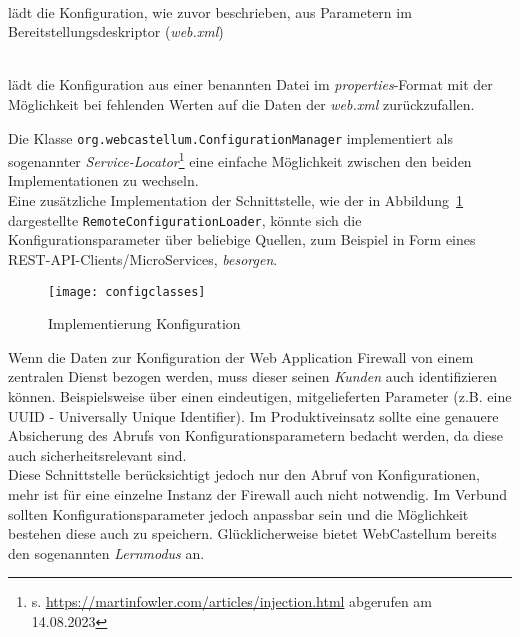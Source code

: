 \begin{description}
  \small
\item[DefaultConfigurationLoader] \hfill \\
  lädt die Konfiguration, wie zuvor beschrieben, aus Parametern im Bereitstellungsdeskriptor (\emph{web.xml})
\item[PropertiesFileConfigurationLoader] \hfill \\
  lädt die Konfiguration aus einer benannten Datei im \emph{properties}-Format mit der Möglichkeit bei fehlenden Werten auf die Daten der \emph{web.xml} zurückzufallen.
\end{description}

Die Klasse \verb=org.webcastellum.ConfigurationManager= implementiert als sogenannter \emph{Service-Locator}\footnote{s. \url{https://martinfowler.com/articles/injection.html} abgerufen am 14.08.2023} eine einfache Möglichkeit zwischen den beiden Implementationen zu wechseln.\\
Eine zusätzliche Implementation der Schnittstelle, wie der in Abbildung~\ref{fig.impkonfig} dargestellte \verb=RemoteConfigurationLoader=, könnte sich die Konfigurationsparameter über beliebige Quellen, zum Beispiel in Form eines REST-API-Clients/MicroServices, \glqq\emph{besorgen}\grqq. 

\begin{figure}[h]
  \begin{center}
    \texttt{[image: configclasses]}
    \caption{Implementierung Konfiguration}
    \label{fig.impkonfig}
  \end{center}
\end{figure}

Wenn die Daten zur Konfiguration der Web Application Firewall von einem zentralen Dienst bezogen werden, muss dieser seinen \emph{Kunden} auch identifizieren können. Beispielsweise über einen eindeutigen, mitgelieferten Parameter (z.B. eine UUID - Universally Unique Identifier). Im Produktiveinsatz sollte eine genauere Absicherung des Abrufs von Konfigurationsparametern bedacht werden, da diese auch sicherheitsrelevant sind.\\

Diese Schnittstelle berücksichtigt jedoch nur den Abruf von Konfigurationen, mehr ist für eine einzelne Instanz der Firewall auch nicht notwendig. Im Verbund sollten Konfigurationsparameter jedoch anpassbar sein und die Möglichkeit bestehen diese auch zu speichern. Glücklicherweise bietet WebCastellum bereits den sogenannten \glqq\emph{Lernmodus}\grqq{} an.  




